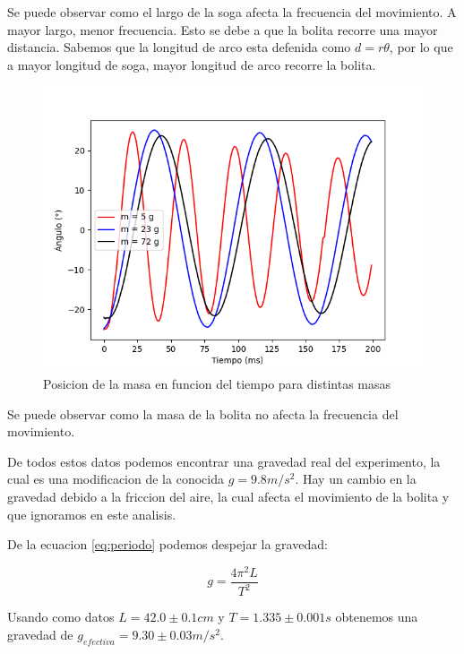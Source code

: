 \documentclass[12pt,a4]{article}
\begin{document}
Se puede observar como el largo de la soga afecta la frecuencia del movimiento. A mayor largo, menor frecuencia. Esto se debe a que la bolita recorre una mayor distancia. Sabemos que la longitud de arco esta defenida como $d = r \theta$, por lo que a mayor longitud de soga, mayor longitud de arco recorre la bolita.

\begin{figure}[H]
    \centering
    \includegraphics[width=0.6\linewidth]{peso.png}
    \caption{Posicion de la masa en funcion del tiempo para distintas masas}
    \label{fig:masa}
\end{figure}

Se puede observar como la masa de la bolita no afecta la frecuencia del movimiento.

De todos estos datos podemos encontrar una gravedad real del experimento, la cual es una modificacion de la conocida $g = 9.8 m/s^2$. Hay un cambio en la gravedad debido a la friccion del aire, la cual afecta el movimiento de la bolita y que ignoramos en este analisis.

De la ecuacion \ref{eq:periodo} podemos despejar la gravedad:

\begin{equation}
    g = \frac{4 \pi^2 L}{T^2}
    \label{eq:gravedad}
\end{equation}

Usando como datos $L = 42.0 \pm 0.1 cm$ y $T = 1.335 \pm 0.001 s$ obtenemos una gravedad de $g_{efectiva} = 9.30 \pm 0.03 m/s^2$.
\end{document}
